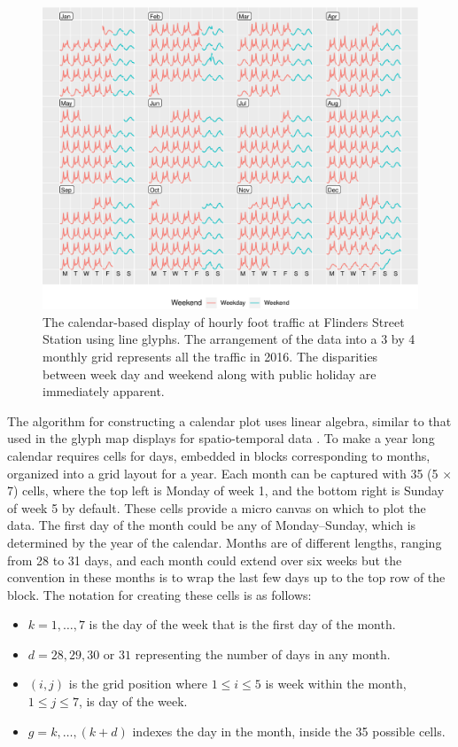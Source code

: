 \documentclass[12pt]{article}
\providecommand{\tightlist}{%
  \setlength{\itemsep}{0pt}\setlength{\parskip}{0pt}}
\begin{document}
\begin{figure}

{\centering \includegraphics[width=\textwidth]{figure/flinders-2016-1} 

}

\caption{The calendar-based display of hourly foot traffic at Flinders Street Station using line glyphs. The arrangement of the data into a 3 by 4 monthly grid represents all the traffic in 2016. The disparities between week day and weekend along with public holiday are immediately apparent.}\label{fig:flinders-2016}
\end{figure}

The algorithm for constructing a calendar plot uses linear algebra,
similar to that used in the glyph map displays for spatio-temporal data
\citep{Wickham2012glyph}. To make a year long calendar requires cells
for days, embedded in blocks corresponding to months, organized into a
grid layout for a year. Each month can be captured with 35 (5 \(\times\)
7) cells, where the top left is Monday of week 1, and the bottom right
is Sunday of week 5 by default. These cells provide a micro canvas on
which to plot the data. The first day of the month could be any of
Monday--Sunday, which is determined by the year of the calendar. Months
are of different lengths, ranging from 28 to 31 days, and each month
could extend over six weeks but the convention in these months is to
wrap the last few days up to the top row of the block. The notation for
creating these cells is as follows:

\begin{itemize}
\tightlist
\item
  \(k = 1, \dots , 7\) is the day of the week that is the first day of
  the month.
\item
  \(d = 28, 29, 30\) or \(31\) representing the number of days in any
  month.
\item
  \((i, j)\) is the grid position where \(1 \le i \le 5\) is week within
  the month, \(1 \le j \le 7\), is day of the week.
\item
  \(g = k, \dots,(k+d)\) indexes the day in the month, inside the 35
  possible cells.
\end{itemize}
\end{document}
